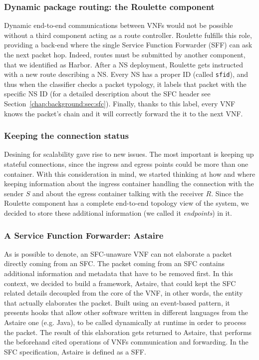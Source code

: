\subsubsection{Dynamic package routing: the Roulette component}
\label{chap:prjan:sec:tech:sub:SFC:sub:roulette}
Dynamic end-to-end communications between VNFs would not be possible without a
third component acting as a route controller. Roulette fulfills this role,
providing a back-end where the single Service Function Forwarder (SFF) can ask
the next packet hop. Indeed, routes must be submitted by another component, that
we identified as Harbor. After a NS deployment, Roulette gets instructed with a
new route describing a NS. Every NS has a proper ID (called \verb!sfid!), and
thus when the classifier checks a packet typology, it labels that packet with
the specific NS ID (for a detailed description about the SFC header see
Section~\ref{chap:background:sec:sfc}). Finally, thanks to this label, every VNF
knows the packet's chain and it will correctly forward the it to the next VNF.

\subsubsection{Keeping the connection status}
Desining for scalability gave rise to new issues. The most important is keeping
up stateful connections, since the ingress and egress points could be more than
one container. With this consideration in mind, we started thinking at how and
where keeping information about the ingress container handling the connection
with the sender $S$ and about the egress container talking with the receiver
$R$. Since the Roulette component has a complete end-to-end topology view of the
system, we decided to store these additional information (we called it
\emph{endpoints}) in it.

\subsubsection{A Service Function Forwarder: Astaire}
As is possible to denote, an SFC-unaware VNF can not elaborate a packet directly
coming from an SFC. The packet coming from an SFC contains additional
information and metadata that have to be removed first. In this context, we
decided to build a framework, Astaire, that could kept the SFC related details
decoupled from the core of the VNF, in other words, the entity that actually
elaborates the packet. Built using an event-based pattern, it presents hooks
that allow other software written in different languages from the Astaire one
(e.g. Java), to be called dynamically at runtime in order to process the packet.
The result of this elaboration gets returned to Astaire, that performs the
beforehand cited operations of VNFs communication and forwarding. In the SFC
specification, Astaire is defined as a SFF.

